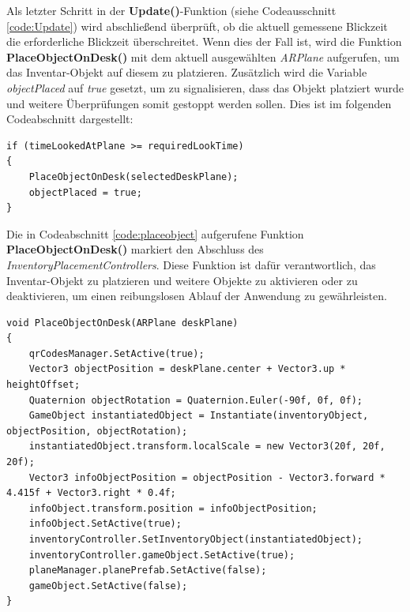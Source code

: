 Als letzter Schritt in der \textbf{Update()}-Funktion (siehe Codeausschnitt \ref{code:Update}) wird abschließend überprüft,
ob die aktuell gemessene Blickzeit die erforderliche Blickzeit überschreitet. Wenn dies der Fall ist, wird die Funktion
\textbf{PlaceObjectOnDesk()} mit dem aktuell ausgewählten \textit{ARPlane} aufgerufen, um das Inventar-Objekt auf diesem
zu platzieren. Zusätzlich wird die Variable \textit{objectPlaced} auf \textit{true} gesetzt, um zu signalisieren, dass das
Objekt platziert wurde und weitere Überprüfungen somit gestoppt werden sollen. Dies ist im folgenden Codeabschnitt dargestellt:
\begin{lstlisting}[style=csharp, caption={Platzierungsfunktion aufrufen}, label=code:Placement]
if (timeLookedAtPlane >= requiredLookTime)
{
    PlaceObjectOnDesk(selectedDeskPlane);
    objectPlaced = true;
}
\end{lstlisting}


Die in Codeabschnitt \ref{code:placeobject} aufgerufene Funktion \textbf{PlaceObjectOnDesk()} markiert den Abschluss des
\textit{InventoryPlacementControllers}. Diese Funktion ist dafür verantwortlich, das Inventar-Objekt zu platzieren und
weitere Objekte zu aktivieren oder zu deaktivieren, um einen reibungslosen Ablauf der Anwendung zu gewährleisten.

\begin{lstlisting}[style=csharp, caption={Inventar platzier - Funktion}, label=code:placeobject]
void PlaceObjectOnDesk(ARPlane deskPlane)
{
    qrCodesManager.SetActive(true);
    Vector3 objectPosition = deskPlane.center + Vector3.up * heightOffset;
    Quaternion objectRotation = Quaternion.Euler(-90f, 0f, 0f);
    GameObject instantiatedObject = Instantiate(inventoryObject, objectPosition, objectRotation);
    instantiatedObject.transform.localScale = new Vector3(20f, 20f, 20f);
    Vector3 infoObjectPosition = objectPosition - Vector3.forward * 4.415f + Vector3.right * 0.4f;
    infoObject.transform.position = infoObjectPosition;
    infoObject.SetActive(true);
    inventoryController.SetInventoryObject(instantiatedObject);
    inventoryController.gameObject.SetActive(true);
    planeManager.planePrefab.SetActive(false);
    gameObject.SetActive(false);
}
\end{lstlisting}

